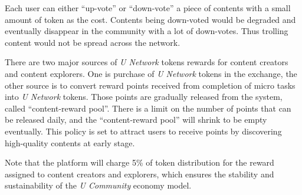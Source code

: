 Each user can either ``up-vote'' or ``down-vote'' a piece of contents with a small amount of token as the cost. Contents being down-voted would be degraded and eventually disappear in the community with a lot of down-votes. Thus trolling content would not be spread across the network. 

There are two major sources of \emph{U Network} tokens rewards for content creators and content explorers. One is purchase of \emph{U Network} tokens in the exchange, the other source is to convert reward points received from completion of micro tasks into \emph{U Network} tokens. Those points are gradually released from the system, called ``content-reward pool''. There is a limit on the number of points that can be released daily, and the ``content-reward pool'' will shrink to be empty eventually. This policy is set to attract users to receive points by discovering high-quality contents at early stage. 

Note that the platform will charge 5\% of token distribution for the reward assigned to content creators and explorers, which ensures the stability and sustainability of the \emph{U Community} economy model.

